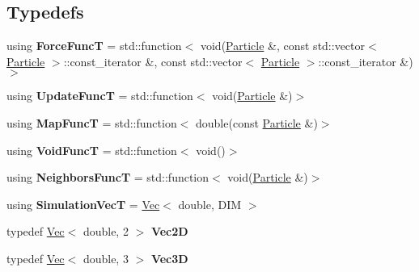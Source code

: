 \subsection*{Typedefs}
\begin{DoxyCompactItemize}
\item 
\mbox{\label{namespacewash_a3687ea698f8cb8c077d728e5d74de495}} 
using {\bfseries Force\+FuncT} = std\+::function$<$ void(\mbox{\hyperlink{classwash_1_1Particle}{Particle}} \&, const std\+::vector$<$ \mbox{\hyperlink{classwash_1_1Particle}{Particle}} $>$\+::const\+\_\+iterator \&, const std\+::vector$<$ \mbox{\hyperlink{classwash_1_1Particle}{Particle}} $>$\+::const\+\_\+iterator \&)$>$
\item 
\mbox{\label{namespacewash_aaae2f0d4980b7c550d6de709b35f0b8e}} 
using {\bfseries Update\+FuncT} = std\+::function$<$ void(\mbox{\hyperlink{classwash_1_1Particle}{Particle}} \&)$>$
\item 
\mbox{\label{namespacewash_ad515914307c88c01ff7524c57feabf83}} 
using {\bfseries Map\+FuncT} = std\+::function$<$ double(const \mbox{\hyperlink{classwash_1_1Particle}{Particle}} \&)$>$
\item 
\mbox{\label{namespacewash_a7de7a4195ce994df4dd54ff86e3fff20}} 
using {\bfseries Void\+FuncT} = std\+::function$<$ void()$>$
\item 
\mbox{\label{namespacewash_a8135d763bfc59fce07b49873d8af0ed6}} 
using {\bfseries Neighbors\+FuncT} = std\+::function$<$ void(\mbox{\hyperlink{classwash_1_1Particle}{Particle}} \&)$>$
\item 
\mbox{\label{namespacewash_ab2cbbc37941b733095c9225b49b4cad9}} 
using {\bfseries Simulation\+VecT} = \mbox{\hyperlink{classwash_1_1Vec}{Vec}}$<$ double, D\+IM $>$
\item 
\mbox{\label{namespacewash_a905f2d902fc7aaab0e8a58b6ee25baf1}} 
typedef \mbox{\hyperlink{classwash_1_1Vec}{Vec}}$<$ double, 2 $>$ {\bfseries Vec2D}
\item 
\mbox{\label{namespacewash_a57da016a0635e7d25a96165adb48c7e3}} 
typedef \mbox{\hyperlink{classwash_1_1Vec}{Vec}}$<$ double, 3 $>$ {\bfseries Vec3D}
\end{DoxyCompactItemize}
